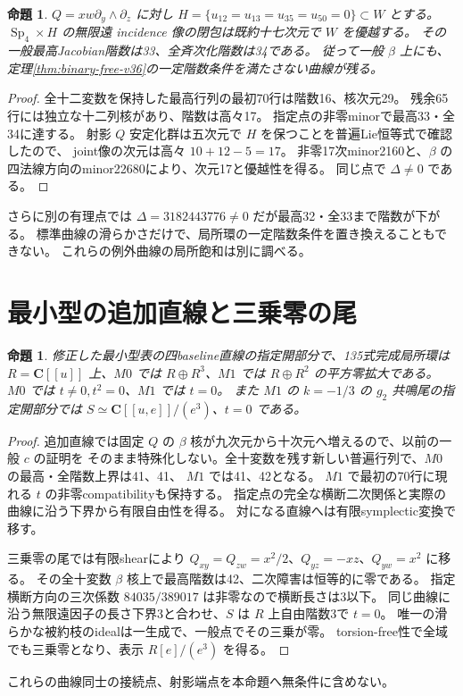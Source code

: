 \documentclass[11pt,a4paper]{ltjsarticle}
\newcommand{\CC}{\mathbf C}
\DeclareMathOperator{\Sp}{Sp}
\newtheorem{proposition}[theorem]{命題}
\theoremstyle{remark}
\begin{document}
\begin{proposition}\label{prop:binary-exception-v36}
$Q=xw\partial_y\wedge\partial_z$ に対し
$H=\{u_{12}=u_{13}=u_{35}=u_{50}=0\}\subset W$ とする。
$\Sp_4\times H$ の無限遠 incidence 像の閉包は既約十七次元で $W$ を優越する。
その一般最高Jacobian階数は33、全斉次化階数は34である。
従って一般 $\beta$ 上にも、定理\ref{thm:binary-free-v36}の一定階数条件を満たさない曲線が残る。
\end{proposition}
\begin{proof}
全十二変数を保持した最高行列の最初70行は階数16、核次元29。
残余65行には独立な十二列核があり、階数は高々17。
指定点の非零minorで最高33・全34に達する。
射影 $Q$ 安定化群は五次元で $H$ を保つことを普遍Lie恒等式で確認したので、
joint像の次元は高々 $10+12-5=17$。
非零17次minor2160と、$\beta$ の四法線方向のminor22680により、次元17と優越性を得る。
同じ点で $\Delta\ne0$ である\cite{binary-drop-v36}。
\end{proof}
さらに別の有理点では $\Delta=3182443776\ne0$ だが最高32・全33まで階数が下がる。
標準曲線の滑らかさだけで、局所環の一定階数条件を置き換えることもできない。
これらの例外曲線の局所飽和は別に調べる。

\section{最小型の追加直線と三乗零の尾}
\begin{proposition}
修正した最小型表の四baseline直線の指定開部分で、135式完成局所環は
$R=\CC[[u]]$ 上、$M0$ では $R\oplus R^3$、$M1$ では $R\oplus R^2$ の平方零拡大である。
$M0$ では $t\ne0,t^2=0$、$M1$ では $t=0$。
また $M1$ の $k=-1/3$ の $g_2$ 共鳴尾の指定開部分では
$S\simeq\CC[[u,e]]/(e^3)$、$t=0$ である。
\end{proposition}
\begin{proof}
追加直線では固定 $Q$ の $\beta$ 核が九次元から十次元へ増えるので、以前の一般 $c$ の証明を
そのまま特殊化しない。全十変数を残す新しい普遍行列で、$M0$ の最高・全階数上界は41、41、
$M1$ では41、42となる。
$M1$ で最初の70行に現れる $t$ の非零compatibilityも保持する。
指定点の完全な横断二次関係と実際の曲線に沿う下界から有限自由性を得る。
対になる直線へは有限symplectic変換で移す\cite{minimal-baseline-v36}。

三乗零の尾では有限shearにより
$Q_{xy}=Q_{zw}=x^2/2$、$Q_{yz}=-xz$、$Q_{yw}=x^2$ に移る。
その全十変数 $\beta$ 核上で最高階数は42、二次障害は恒等的に零である。
指定横断方向の三次係数 $84035/389017$ は非零なので横断長さは3以下。
同じ曲線に沿う無限遠因子の長さ下界3と合わせ、$S$ は $R$ 上自由階数3で $t=0$。
唯一の滑らかな被約枝のidealは一生成で、一般点でその三乗が零。
torsion-free性で全域でも三乗零となり、表示 $R[e]/(e^3)$ を得る\cite{minimal-cubic-v36}。
\end{proof}
これらの曲線同士の接続点、射影端点を本命題へ無条件に含めない。
\end{document}

